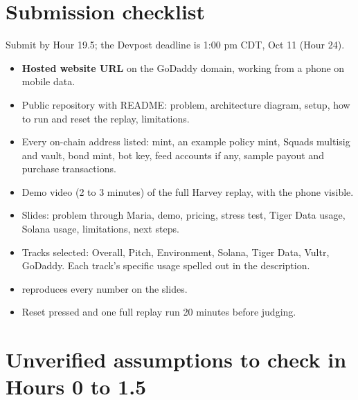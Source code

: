 \documentclass[11pt]{article}
\newcommand{\code}[1]{\texttt{\detokenize{#1}}}
\newcommand{\cb}{$\square$\ }
\begin{document}
\section{Submission checklist}

Submit by Hour 19.5; the Devpost deadline is 1:00 pm CDT, Oct 11 (Hour 24).
\begin{itemize}[label=\cb]
\item \textbf{Hosted website URL} on the GoDaddy domain, working from a phone on mobile data.
\item Public repository with README: problem, architecture diagram, setup, how to run and reset the replay, limitations.
\item Every on-chain address listed: \code{aUSD} mint, an example policy mint, Squads multisig and vault, bond mint, bot key, feed accounts if any, sample payout and purchase transactions.
\item Demo video (2 to 3 minutes) of the full Harvey replay, with the phone visible.
\item Slides: problem through Maria, demo, pricing, stress test, Tiger Data usage, Solana usage, limitations, next steps.
\item Tracks selected: Overall, Pitch, Environment, Solana, Tiger Data, Vultr, GoDaddy. Each track's specific usage spelled out in the description.
\item \code{/docs/numbers.sql} reproduces every number on the slides.
\item Reset pressed and one full replay run 20 minutes before judging.
\end{itemize}

\section{Unverified assumptions to check in Hours 0 to 1.5}
\end{document}

